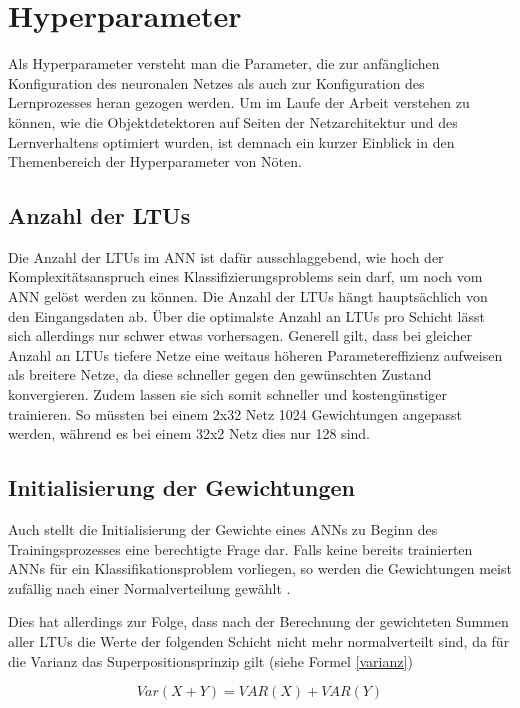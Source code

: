 \section{Hyperparameter}

Als Hyperparameter versteht man die Parameter, die zur anfänglichen Konfiguration des neuronalen Netzes als auch zur Konfiguration des Lernprozesses heran gezogen werden. Um im Laufe der Arbeit verstehen zu können, wie die Objektdetektoren auf Seiten der Netzarchitektur und des Lernverhaltens optimiert wurden, ist demnach ein kurzer Einblick in den Themenbereich der Hyperparameter von Nöten.

\subsection*{Anzahl der LTUs}
Die Anzahl der LTUs im ANN ist dafür ausschlaggebend, wie hoch der Komplexitätsanspruch eines Klassifizierungsproblems sein darf, um noch vom ANN gelöst werden zu können. Die Anzahl der LTUs hängt hauptsächlich von den Eingangsdaten ab. Über die optimalste Anzahl an LTUs pro Schicht lässt sich allerdings nur schwer etwas vorhersagen. Generell gilt, dass bei gleicher Anzahl an LTUs tiefere Netze eine weitaus höheren Parametereffizienz aufweisen als breitere Netze, da diese schneller gegen den gewünschten Zustand konvergieren. Zudem lassen sie sich somit schneller und kostengünstiger trainieren. So müssten bei einem 2x32 Netz 1024 Gewichtungen angepasst werden, während es bei einem 32x2 Netz dies nur 128 sind.  \cite[S. 271 f.]{AurelienGeron.2018}

\subsection*{Initialisierung der Gewichtungen}
Auch stellt die Initialisierung der Gewichte eines ANNs zu Beginn des Trainingsprozesses eine berechtigte Frage dar. Falls keine bereits trainierten ANNs für ein Klassifikationsproblem vorliegen, so werden die Gewichtungen meist zufällig nach einer Normalverteilung gewählt \cite[S. 271]{AurelienGeron.2018}. 

Dies hat allerdings zur Folge, dass nach der Berechnung der gewichteten Summen aller LTUs die Werte der folgenden Schicht nicht mehr normalverteilt sind, da für die Varianz das Superpositionsprinzip gilt (siehe Formel \ref{varianz})

\begin{equation} \label{varianz}
Var(X + Y) = VAR(X) + VAR(Y)
\end{equation}

